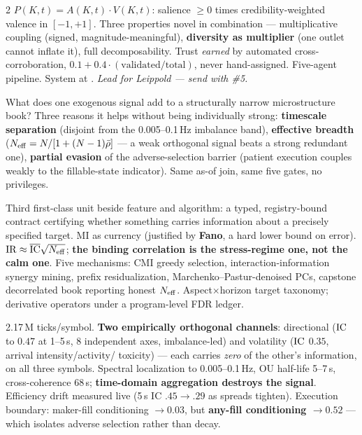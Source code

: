 \documentclass[10pt,a4paper]{article}
\begin{document}
\begin{multicols}{2}
$P(K,t)=A(K,t)\cdot V(K,t)$: salience $\ge0$ times credibility-weighted valence in $[-1,+1]$.
Three properties novel in combination — multiplicative coupling (signed, magnitude-meaningful),
\textbf{diversity as multiplier} (one outlet cannot inflate it), full decomposability. Trust
\emph{earned} by automated cross-corroboration, $0.1+0.4\cdot(\text{validated}/\text{total})$, never
hand-assigned. Five-agent pipeline. System at .  \emph{Lead for Leippold — send with \#5.}

What does one exogenous signal add to a structurally narrow microstructure book? Three reasons it helps
without being individually strong: \textbf{timescale separation} (disjoint from the 0.005--0.1\,Hz
imbalance band), \textbf{effective breadth} ($N_{\mathrm{eff}}=N/[1+(N-1)\bar{\rho}]$ — a weak orthogonal signal beats
a strong redundant one), \textbf{partial evasion} of the adverse-selection barrier (patient execution
couples weakly to the fillable-state indicator). Same as-of join, same five gates, no privileges.

Third first-class unit beside feature and algorithm: a typed, registry-bound contract certifying whether
something carries information about a precisely specified target. MI as currency (justified by
\textbf{Fano}, a hard lower bound on error). $\operatorname{IR}\approx\overline{\mathrm{IC}}\sqrt{N_{\mathrm{eff}}}$; \textbf{the binding
correlation is the stress-regime one, not the calm one}. Five mechanisms: CMI greedy selection,
interaction-information synergy mining, prefix residualization, Marchenko--Pastur-denoised PCs, capstone
decorrelated book reporting honest $N_{\mathrm{eff}}$. Aspect$\times$horizon target taxonomy; derivative operators
under a program-level FDR ledger. 

2.17\,M ticks/symbol. \textbf{Two empirically orthogonal channels}: directional ($\operatorname{IC}$ to $0.47$ at
1--5\,s, 8 independent axes, imbalance-led) and volatility ($\operatorname{IC}$ $0.35$, arrival intensity/activity/
toxicity) — each carries \emph{zero} of the other's information, on all three symbols. Spectral
localization to 0.005--0.1\,Hz, OU half-life 5--7\,s, cross-coherence 68\,s; \textbf{time-domain
aggregation destroys the signal}. Efficiency drift measured live (5\,s IC $.45\to.29$ as spreads tighten).
Execution boundary: maker-fill conditioning $\to0.03$, but \textbf{any-fill conditioning $\to0.52$} —
which isolates adverse selection rather than decay. 


\end{multicols}
\end{document}
